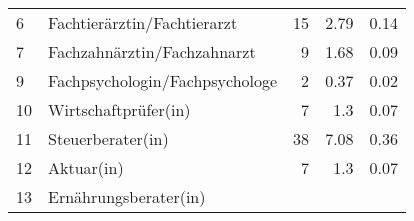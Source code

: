 \begin{longtable}{lXrrr}
     6 &
     \multicolumn{1}{X}{ Fachtierärztin/Fachtierarzt   } &


       \num{15} &
       \num[round-mode=places,round-precision=2]{2.79} &
         \num[round-mode=places,round-precision=2]{0.14} \\

     7 &
     \multicolumn{1}{X}{ Fachzahnärztin/Fachzahnarzt   } &


       \num{9} &
       \num[round-mode=places,round-precision=2]{1.68} &
         \num[round-mode=places,round-precision=2]{0.09} \\

     9 &
     \multicolumn{1}{X}{ Fachpsychologin/Fachpsychologe   } &


       \num{2} &
       \num[round-mode=places,round-precision=2]{0.37} &
         \num[round-mode=places,round-precision=2]{0.02} \\

     10 &
     \multicolumn{1}{X}{ Wirtschaftprüfer(in)   } &


       \num{7} &
       \num[round-mode=places,round-precision=2]{1.3} &
         \num[round-mode=places,round-precision=2]{0.07} \\

     11 &
     \multicolumn{1}{X}{ Steuerberater(in)   } &


       \num{38} &
       \num[round-mode=places,round-precision=2]{7.08} &
         \num[round-mode=places,round-precision=2]{0.36} \\

     12 &
     \multicolumn{1}{X}{ Aktuar(in)   } &


       \num{7} &
       \num[round-mode=places,round-precision=2]{1.3} &
         \num[round-mode=places,round-precision=2]{0.07} \\

     13 &
     \multicolumn{1}{X}{ Ernährungsberater(in)   } &



\end{longtable}
